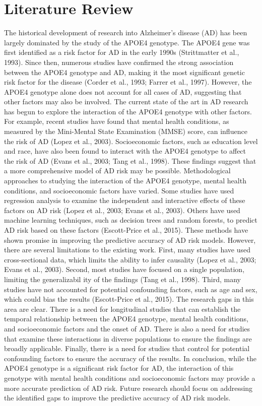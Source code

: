 \documentclass[conference]{IEEEtran}
\begin{document}
\section{Literature Review}
The historical development of research into Alzheimer's disease (AD) has been largely dominated by the study of the APOE4 genotype. The APOE4 gene was first identified as a risk factor for AD in the early 1990s (Strittmatter et al., 1993). Since then, numerous studies have confirmed the strong association between the APOE4 genotype and AD, making it the most significant genetic risk factor for the disease (Corder et al., 1993; Farrer et al., 1997). However, the APOE4 genotype alone does not account for all cases of AD, suggesting that other factors may also be involved. The current state of the art in AD research has begun to explore the interaction of the APOE4 genotype with other factors. For example, recent studies have found that mental health conditions, as measured by the Mini-Mental State Examination (MMSE) score, can influence the risk of AD (Lopez et al., 2003). Socioeconomic factors, such as education level and race, have also been found to interact with the APOE4 genotype to affect the risk of AD (Evans et al., 2003; Tang et al., 1998). These findings suggest that a more comprehensive model of AD risk may be possible. Methodological approaches to studying the interaction of the APOE4 genotype, mental health conditions, and socioeconomic factors have varied. Some studies have used regression analysis to examine the independent and interactive effects of these factors on AD risk (Lopez et al., 2003; Evans et al., 2003). Others have used machine learning techniques, such as decision trees and random forests, to predict AD risk based on these factors (Escott-Price et al., 2015). These methods have shown promise in improving the predictive accuracy of AD risk models. However, there are several limitations to the existing work. First, many studies have used cross-sectional data, which limits the ability to infer causality (Lopez et al., 2003; Evans et al., 2003). Second, most studies have focused on a single population, limiting the generalizabil ity of the findings (Tang et al., 1998). Third, many studies have not accounted for potential confounding factors, such as age and sex, which could bias the results (Escott-Price et al., 2015). The research gaps in this area are clear. There is a need for longitudinal studies that can establish the temporal relationship between the APOE4 genotype, mental health conditions, and socioeconomic factors and the onset of AD. There is also a need for studies that examine these interactions in diverse populations to ensure the findings are broadly applicable. Finally, there is a need for studies that control for potential confounding factors to ensure the accuracy of the results. In conclusion, while the APOE4 genotype is a significant risk factor for AD, the interaction of this genotype with mental health conditions and socioeconomic factors may provide a more accurate prediction of AD risk. Future research should focus on addressing the identified gaps to improve the predictive accuracy of AD risk models.
\end{document}
